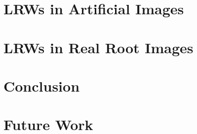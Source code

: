 \documentclass{uofsthesis-cs}
\begin{document}
    

  
\chapter{LRWs in Artificial Images}

  

  

  
  
  
  
  

  


  
  
\chapter{LRWs in Real Root Images}

 

\chapter{Conclusion}
  


  
\chapter{Future Work}

 





\end{document}
